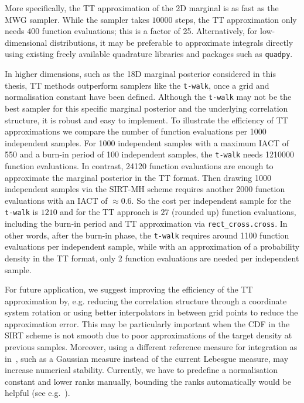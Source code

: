 More specifically, the TT approximation of the 2D marginal is as fast as the MWG sampler.
While the sampler takes $10000$ steps, the TT approximation only needs $400$ function evaluations; this is a factor of 25.
Alternatively, for low-dimensional distributions, it may be preferable to approximate integrals directly using existing freely available quadrature libraries and packages such as \texttt{quadpy}.

In higher dimensions, such as the 18D marginal posterior considered in this thesis, TT methods outperform samplers like the \texttt{t-walk}, once a grid and normalisation constant have been defined.
Although the \texttt{t-walk} may not be the best sampler for this specific marginal posterior and the underlying correlation structure, it is robust and easy to implement.
To illustrate the efficiency of TT approximations we compare the number of function evaluations per 1000 independent samples.
For 1000 independent samples with a maximum IACT of 550 and a burn-in period of 100 independent samples, the \texttt{t-walk} needs 1210000 function evaluations. 
In contrast, 24120 function evaluations are enough to approximate the marginal posterior in the TT format.
Then drawing 1000 independent samples via the SIRT-MH scheme requires another 2000 function evaluations with an IACT of $\approx 0.6$.
So the cost per independent sample for the \texttt{t-walk} is $1210$ and for the TT approach is $27$ (rounded up) function evaluations, including the burn-in period and TT approximation via \texttt{rect\_cross.cross}.
In other words, after the burn-in phase, the \texttt{t-walk} requires around 1100 function evaluations per independent sample, while with an approximation of a probability density in the TT format, only 2 function evaluations are needed per independent sample.

For future application, we suggest improving the efficiency of the TT approximation by, e.g. reducing the correlation structure through a coordinate system rotation or using better interpolators in between grid points to reduce the approximation error.
This may be particularly important when the CDF in the SIRT scheme is not smooth due to poor approximations of the target density at previous samples.  
Moreover, using a different reference measure for integration as in~\cite{cui2022deep}, such as a Gaussian measure instead of the current Lebesgue measure, may increase numerical stability.
Currently, we have to predefine a normalisation constant and lower ranks manually, bounding the ranks automatically would be helpful (see e.g.~\cite{Rohrbach2022tterror}).



